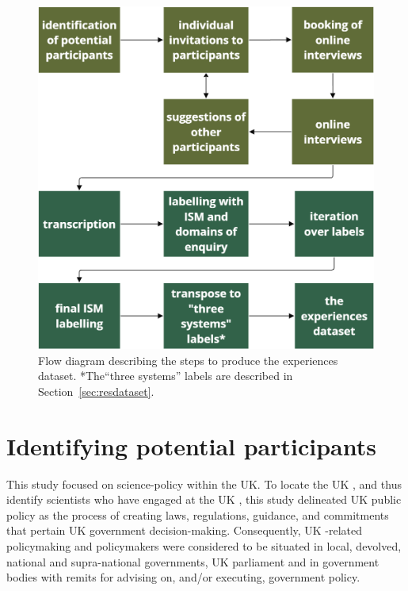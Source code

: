 




\begin{figure}[!ht]
    \centering
    \includegraphics[width=.75\linewidth]{figures/method_flow.png}
    \caption{Flow diagram describing the steps to produce the experiences dataset. *The``three systems'' labels are described in Section~\ref{sec:resdataset}.}
    \label{fig:metflowchart}
\end{figure}

\section{Identifying potential participants}\label{sec:metidentify}
This study focused on \CAN{} science-policy within the UK. To locate the UK \SPI, and thus identify scientists who have engaged at the UK \SPI, this study delineated UK public policy as the process of creating laws, regulations, guidance, and commitments that pertain UK government decision-making. Consequently, UK \CAN-related policymaking and policymakers were considered to be situated in local, devolved, national and supra-national governments, UK parliament and in government bodies with remits for advising on, and/or executing, \CAN{} government policy.


